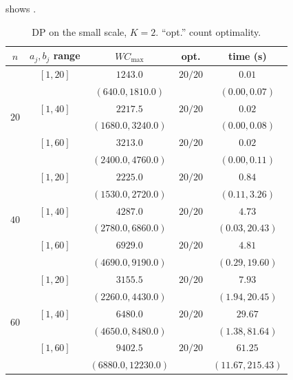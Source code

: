 \documentclass[12pt]{article}
\newlength{\resultstabwidth}
\newcommand{\resultstable}{%
    \centering
    \footnotesize
    \setlength{\tabcolsep}{4pt}%
    \renewcommand{\arraystretch}{1.15}}
\begin{document}
\begin{sloppypar}
 shows \TBD.

\begin{table}[H]
\resultstable
\caption{DP on the small scale, $K=2$. ``opt.'' count optimality.}
\label{tab:results-small-dp}
\begin{tabular*}{\resultstabwidth}{@{\extracolsep{\fill}}ccccc@{}}
\toprule
$n$ & $a_j,b_j$ range & $W C_{\max}$ & opt. & time (s) \\
\midrule
\multirow{6}{*}{$20$} & $[1,20]$ & $1243.0$ & $20/20$ & $0.01$ \\
                      &          & $(640.0,1810.0)$ &       & $(0.00,0.07)$ \\
                      & $[1,40]$ & $2217.5$ & $20/20$ & $0.02$ \\
                      &          & $(1680.0,3240.0)$ &       & $(0.00,0.08)$ \\
                      & $[1,60]$ & $3213.0$ & $20/20$ & $0.02$ \\
                      &          & $(2400.0,4760.0)$ &       & $(0.00,0.11)$ \\
\midrule
\multirow{6}{*}{$40$} & $[1,20]$ & $2225.0$ & $20/20$ & $0.84$ \\
                      &          & $(1530.0,2720.0)$ &       & $(0.11,3.26)$ \\
                      & $[1,40]$ & $4287.0$ & $20/20$ & $4.73$ \\
                      &          & $(2780.0,6860.0)$ &       & $(0.03,20.43)$ \\
                      & $[1,60]$ & $6929.0$ & $20/20$ & $4.81$ \\
                      &          & $(4690.0,9190.0)$ &       & $(0.29,19.60)$ \\
\midrule
\multirow{6}{*}{$60$} & $[1,20]$ & $3155.5$ & $20/20$ & $7.93$ \\
                      &          & $(2260.0,4430.0)$ &       & $(1.94,20.45)$ \\
                      & $[1,40]$ & $6480.0$ & $20/20$ & $29.67$ \\
                      &          & $(4650.0,8480.0)$ &       & $(1.38,81.64)$ \\
                      & $[1,60]$ & $9402.5$ & $20/20$ & $61.25$ \\
                      &          & $(6880.0,12230.0)$ &       & $(11.67,215.43)$ \\
\bottomrule
\end{tabular*}
\end{table}


\end{sloppypar}
\end{document}
